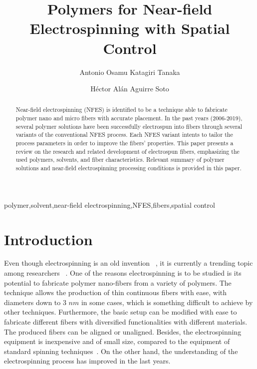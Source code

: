 \documentclass[5p,,preprint,12pt,twocolumn]{elsarticle}
\begin{document}
\begin{frontmatter}
	
\title{Polymers for Near-field Electrospinning with Spatial Control
}
    
\author[]{Antonio Osamu Katagiri Tanaka}
\author[]{H{\'e}ctor Al\'{a}n Aguirre Soto}
    

\begin{abstract}
Near-field electrospinning (NFES) is identified to be a technique able to fabricate polymer nano and micro fibers with accurate placement. In the past years (2006-2019), several polymer solutions have been successfully electrospun into fibers through several variants of the conventional NFES process. Each NFES variant intents to tailor the process parameters in order to improve the fibers' properties. This paper presents a review on the research and related development of electrospun fibers, emphasizing the used polymers, solvents, and fiber characteristics. Relevant summary of polymer solutions and near-field electrospinning processing conditions is provided in this paper.
\end{abstract}
\begin{keyword} 
      polymer\sep solvent\sep near-field electrospinning\sep NFES\sep fibers\sep spatial control
\end{keyword}
      
\end{frontmatter}
\tableofcontents

    
\section{Introduction}
Even though electrospinning is an old invention \unskip~\cite{527120:12073288}, it is currently a trending topic among researchers \unskip~\cite{527120:12073453,527120:12073495,527120:12073496}. One of the reasons electrospinning is to be studied is its potential to fabricate polymer nano-fibers from a variety of polymers. The technique allows the production of thin continuous fibers with ease, with diameters down to 3 $nm $ in some cases, which is something difficult to achieve by other techniques. Furthermore, the basic setup can be modified with ease to fabricate different fibers with diversified functionalities with different materials. The produced fibers can be aligned or unaligned. Besides, the electrospinning equipment is inexpensive and of small size, compared to the equipment of standard spinning techniques\unskip~\cite{527120:12073538}. On the other hand, the understanding of the electrospinning process has improved in the last years.
\end{document}
